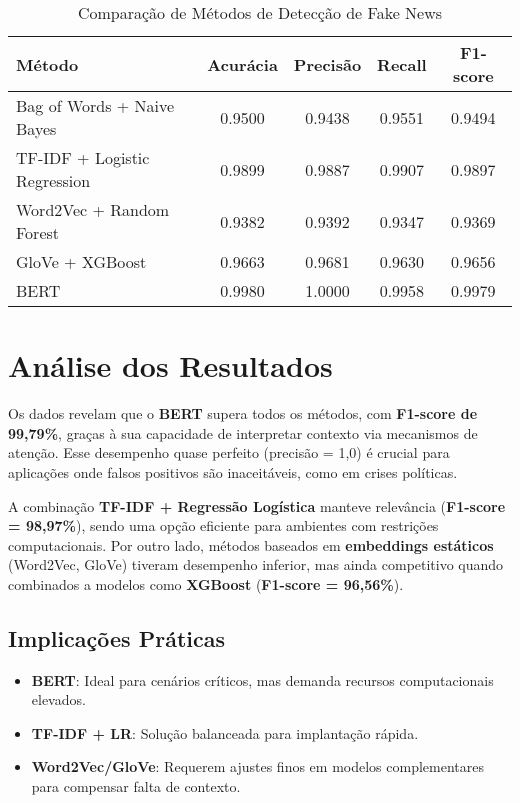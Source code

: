 \documentclass[conference]{IEEEtran}
\begin{document}
\begin{table*}[ht]
\centering
\caption{Comparação de Métodos de Detecção de Fake News}
\label{tab:resultados}
\begin{tabular}{|l|c|c|c|c|}
\hline
\textbf{Método} & \textbf{Acurácia} & \textbf{Precisão} & \textbf{Recall} & \textbf{F1-score} \\
\hline
Bag of Words + Naive Bayes & 0.9500 & 0.9438 & 0.9551 & 0.9494 \\
\hline
TF-IDF + Logistic Regression & 0.9899 & 0.9887 & 0.9907 & 0.9897 \\
\hline
Word2Vec + Random Forest & 0.9382 & 0.9392 & 0.9347 & 0.9369 \\
\hline
GloVe + XGBoost & 0.9663 & 0.9681 & 0.9630 & 0.9656 \\
\hline
BERT & 0.9980 & 1.0000 & 0.9958 & 0.9979 \\
\hline
\end{tabular}
\end{table*}

\section*{Análise dos Resultados}

Os dados revelam que o \textbf{BERT} supera todos os métodos, com \textbf{F1-score de 99,79\%}, graças à sua capacidade de interpretar contexto via mecanismos de atenção. Esse desempenho quase perfeito (precisão = 1,0) é crucial para aplicações onde falsos positivos são inaceitáveis, como em crises políticas.

A combinação \textbf{TF-IDF + Regressão Logística} manteve relevância (\textbf{F1-score = 98,97\%}), sendo uma opção eficiente para ambientes com restrições computacionais. Por outro lado, métodos baseados em \textbf{embeddings estáticos} (Word2Vec, GloVe) tiveram desempenho inferior, mas ainda competitivo quando combinados a modelos como \textbf{XGBoost} (\textbf{F1-score = 96,56\%}).

\subsection*{Implicações Práticas}
\begin{itemize}
    \item \textbf{BERT}: Ideal para cenários críticos, mas demanda recursos computacionais elevados.
    \item \textbf{TF-IDF + LR}: Solução balanceada para implantação rápida.
    \item \textbf{Word2Vec/GloVe}: Requerem ajustes finos em modelos complementares para compensar falta de contexto.
\end{itemize}
\end{document}

